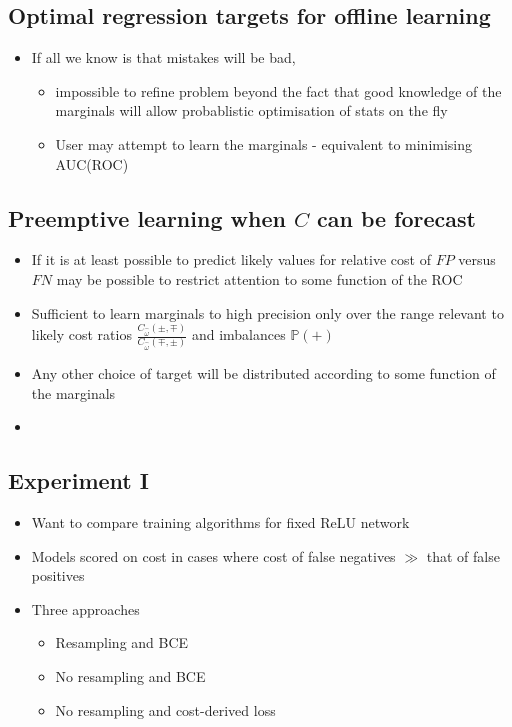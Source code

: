 \documentclass{article}
\newcommand{\Phase}{{\omega}}
\newcommand{\PhaseK}{{\widehat\Phase}}
\newcommand{\SCORE}{{C}}
\newcommand{\FP}{{FP}}
\newcommand{\FN}{{FN}}
\begin{document}
\subsection{Optimal regression targets for offline learning}
  \begin{itemize}
  \item
    If all we know is that mistakes will be bad,
      \begin{itemize}
        \item
          impossible to refine problem beyond the fact that good knowledge of the marginals will allow probablistic optimisation of stats on the fly
        \item
          User may attempt to learn the marginals - equivalent to minimising AUC(ROC)
      \end{itemize}
  \end{itemize}
  
  
    \subsection{Preemptive learning when $C$ can be forecast}
  \begin{itemize}
  \item
    If it is at least possible to predict likely values for relative cost of $\FP$ versus $\FN$ may be possible to restrict attention to some function of the ROC
  \item
    Sufficient to learn marginals to high precision only over the range relevant to likely cost ratios $\frac{\SCORE_\PhaseK(\pm,\mp)}{\SCORE_\PhaseK(\mp,\pm)}$ and imbalances $\mathbb P(+)$
  \item
    Any other choice of target will be distributed according to some function of the marginals
  \item
    
  \end{itemize}
  \subsection{Experiment I}
  \begin{itemize}
    \item
      Want to compare training algorithms for fixed ReLU network
    \item
      Models scored on cost in cases where cost of false negatives $\gg$ that of false positives
    \item
      Three approaches
      \begin{itemize}
        \item
          Resampling and BCE
        \item
          No resampling and BCE
        \item
          No resampling and cost-derived loss
      \end{itemize}
  \end{itemize}
\end{document}
